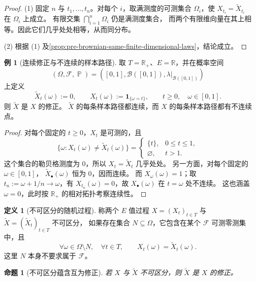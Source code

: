 \documentclass[UTF8,11pt,a4paper,oneside,fontset=fandol]{ctexrep}
\numberwithin{equation}{section}
\theoremstyle{plain}
\newtheorem{proposition}[theorem]{命题}
\theoremstyle{definition}
\newtheorem{definition}[theorem]{定义}
\newtheorem{example}[theorem]{例}
\theoremstyle{remark}
\newcommand{\R}{\mathbb{R}}
\newcommand{\B}{\mathcal{B}}
\newcommand{\F}{\mathcal{F}}
\DeclareMathOperator{\Prob}{\mathbb{P}}
\newcommand{\ind}[1]{\mathbf{1}_{#1}}
\begin{document}
\begin{proof}
(1) 固定 $n$ 与 $t_1,\ldots,t_n$。对每个 $i$，取满测度的可测集合
$\Omega_i$，使 $X_{t_i}=\widetilde X_{t_i}$ 在 $\Omega_i$ 上成立。
有限交集 $\bigcap_{i=1}^{n}\Omega_i$ 仍是满测度集合，
而两个有限维向量在其上相等。因此它们几乎处处相等，从而同分布。

(2) 根据 (1) 及\cref{prop:pre-brownian-same-finite-dimensional-laws}，结论成立。
\end{proof}

\begin{example}[连续修正与不连续的样本路径]
\label{ex:modification-spike-paths}
取 $T=\R_+$、$E=\R$，并在概率空间
\[
  (\Omega,\F,\Prob)
  =\left([0,1],\B([0,1]),\lambda\big|_{\B([0,1])}\right)
\]
上定义
\[
  \widetilde X_t(\omega):=0,\qquad
  X_t(\omega):=\ind{\{\omega=t\}},
  \qquad t\ge0,\quad\omega\in[0,1].
\]
则 $\widetilde X$ 是 $X$ 的修正。
$\widetilde X$ 的每条样本路径都连续，而 $X$ 的每条样本路径都有不连续点。
\end{example}

\begin{proof}
对每个固定的 $t\ge0$，$X_t$ 是可测的，且
\[
  \{\omega:X_t(\omega)\ne\widetilde X_t(\omega)\}
  =\begin{cases}
     \{t\},&0\le t\le1,\\
     \varnothing,&t>1.
   \end{cases}
\]
这个集合的勒贝格测度为 $0$，所以 $X_t=\widetilde X_t$ 几乎处处。
另一方面，对每个固定的 $\omega\in[0,1]$，
$\widetilde X_\bullet(\omega)$ 恒为 $0$，因而连续。
而 $X_\omega(\omega)=1$；取 $t_n:=\omega+1/n\to\omega$，有
$X_{t_n}(\omega)=0$，故 $X_\bullet(\omega)$ 在 $t=\omega$ 处不连续。
这也涵盖 $\omega=0$，此时按 $\R_+$ 的相对拓扑考察连续性。
\end{proof}

\begin{definition}[不可区分的随机过程]
\label{def:indistinguishable-processes}
称两个 $E$ 值过程 $X=(X_t)_{t\in T}$ 与
$\widetilde X=(\widetilde X_t)_{t\in T}$ 不可区分，
如果存在集合 $N\subseteq\Omega$，它包含在某个 $\F$ 可测零测集中，且
\[
  \forall\omega\in\Omega\setminus N,\quad\forall t\in T,\qquad
  X_t(\omega)=\widetilde X_t(\omega).
\]
这里 $N$ 本身不要求属于 $\F$。
\end{definition}

\begin{proposition}[不可区分蕴含互为修正]
\label{prop:indistinguishable-implies-modification}
若 $X$ 与 $\widetilde X$ 不可区分，则 $\widetilde X$ 是 $X$ 的修正。
\end{proposition}
\end{document}
